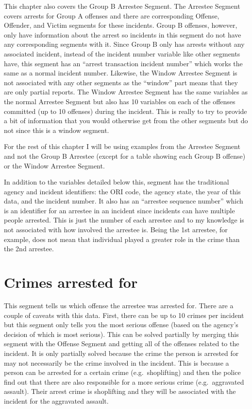\documentclass[
]{krantz}
\begin{document}
This chapter also covers the Group B Arrestee Segment. The
Arrestee Segment covers arrests for Group A offenses and
there are corresponding Offense, Offender, and Victim
segments for these incidents. Group B offenses, however,
only have information about the arrest so incidents in this
segment do not have any corresponding segments with it.
Since Group B only has arrests without any associated
incident, instead of the incident number variable like other
segments have, this segment has an ``arrest transaction
incident number'' which works the same as a normal incident
number. Likewise, the Window Arrestee Segment is not
associated with any other segments as the ``window'' part
means that they are only partial reports. The Window
Arrestee Segment has the same variables as the normal
Arrestee Segment but also has 10 variables on each of the
offenses committed (up to 10 offenses) during the incident.
This is really to try to provide a bit of information that
you would otherwise get from the other segments but do not
since this is a window segment.

For the rest of this chapter I will be using examples from
the Arrestee Segment and not the Group B Arrestee (except
for a table showing each Group B offense) or the Window
Arrestee Segment.

In addition to the variables detailed below this, segment
has the traditional agency and incident identifiers: the ORI
code, the agency state, the year of this data, and the
incident number. It also has an ``arrestee sequence number''
which is an identifier for an arrestee in an incident since
incidents can have multiple people arrested. This is just
the number of each arrestee and to my knowledge is not
associated with how involved the arrestee is. Being the 1st
arrestee, for example, does not mean that individual played
a greater role in the crime than the 2nd arrestee.

\section{Crimes arrested for}\label{crimes-arrested-for}

This segment tells us which offense the arrestee was
arrested for. There are a couple of caveats with this data.
First, there can be up to 10 crimes per incident but this
segment only tells you the most serious offense (based on
the agency's decision of which is most serious). This can be
solved partially by merging this segment with the Offense
Segment and getting all of the offenses related to the
incident. It is only partially solved because the crime the
person is arrested for may not necessarily be the crime
involved in the incident. This is because a person can be
arrested for a certain crime (e.g.~shoplifting) and then the
police find out that there are also responsible for a more
serious crime (e.g.~aggravated assault). Their arrest crime
is shoplifting and they will be associated with the incident
for the aggravated assault.
\end{document}

